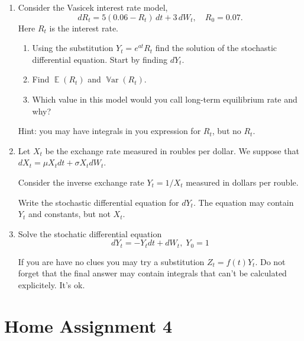 \documentclass[12pt]{article}
\DeclareMathOperator{\Var}{\mathbb{V}ar}
\DeclareMathOperator{\E}{\mathbb{E}}
\begin{document}
\begin{enumerate}
  
  
  \item Consider the Vasicek interest rate model, 
  \[
    dR_t=5(0.06 - R_t) \, dt + 3 \, dW_t, \quad R_0 = 0.07.
  \]
  Here $R_t$ is the interest rate.
  \begin{enumerate}
  \item Using the substitution $Y_t=e^{at} R_t$ find the solution of the stochastic differential equation.
  Start by finding $dY_t$. 
  \item Find $\E(R_t)$ and $\Var(R_t)$.
  \item Which value in this model would you call long-term equilibrium rate and why?
  \end{enumerate}
  
  Hint: you may have integrals in you expression for $R_t$, but no $R_t$.
  
  \item Let $X_t$ be the exchange rate measured in roubles per dollar. 
  We suppose that $dX_t = \mu X_t dt + \sigma X_t dW_t$. 
  
  Consider the inverse exchange rate $Y_t = 1/X_t$ measured in dollars per rouble. 
  
  Write the stochastic differential equation for $dY_t$. 
  The equation may contain $Y_t$ and constants, but not $X_t$.
  
  \item Solve the stochatic differential equation
\[
dY_t = - Y_t dt + dW_t, \; Y_0 = 1
\]

If you are have no clues you may try a substitution $Z_t = f(t) Y_t$. 
Do not forget that the final answer may contain integrals that can't be calculated explicitely. It's ok.




  \end{enumerate}
  


\newpage
\section*{Home Assignment 4}
\end{document}
